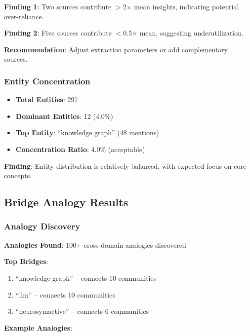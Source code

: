 \documentclass[11pt,twocolumn]{article}
\begin{document}
\textbf{Finding 1}: Two sources contribute $>$2$\times$ mean insights, indicating potential over-reliance.

\textbf{Finding 2}: Five sources contribute $<$0.5$\times$ mean, suggesting underutilization.

\textbf{Recommendation}: Adjust extraction parameters or add complementary sources.

\subsubsection{Entity Concentration}

\begin{itemize}
\item \textbf{Total Entities}: 297
\item \textbf{Dominant Entities}: 12 (4.0\%)
\item \textbf{Top Entity}: ``knowledge graph'' (48 mentions)
\item \textbf{Concentration Ratio}: 4.0\% (acceptable)
\end{itemize}

\textbf{Finding}: Entity distribution is relatively balanced, with expected focus on core concepts.

\subsection{Bridge Analogy Results}

\subsubsection{Analogy Discovery}

\textbf{Analogies Found}: 100+ cross-domain analogies discovered

\textbf{Top Bridges}:
\begin{enumerate}
\item ``knowledge graph'' -- connects 10 communities
\item ``llm'' -- connects 10 communities
\item ``neurosymactive'' -- connects 6 communities
\end{enumerate}

\textbf{Example Analogies}:
\end{document}

